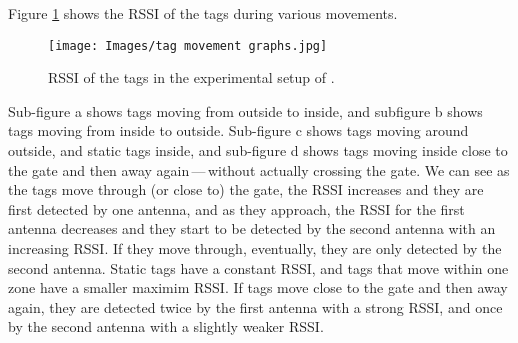 \documentclass{article}
\begin{document}
Figure \ref{fig:Alfian_setup} shows the \ac{RSSI} of the tags during various movements.
%
\begin{figure}[h]
    \centering
    \texttt{[image: Images/tag movement graphs.jpg]}
    \caption{RSSI of the tags in the experimental setup of \citet{ref:Alfian}.}
    \label{fig:Alfian_setup}
\end{figure}
%
Sub-figure a shows tags moving from outside to inside, and subfigure b shows tags moving from inside to outside.
Sub-figure c shows tags moving around outside, and static tags inside, and sub-figure d shows tags moving inside close to the gate and then away again\,---\,without actually crossing the gate.
We can see as the tags move through (or close to) the gate, the \ac{RSSI} increases and they are first detected by one antenna, and as they approach, the \ac{RSSI} for the first antenna decreases and they start to be detected by the second antenna with an increasing \ac{RSSI}.
If they move through, eventually, they are only detected by the second antenna.
Static tags have a constant \ac{RSSI}, and tags that move within one zone have a smaller maximim \ac{RSSI}.
If tags move close to the gate and then away again, they are detected twice by the first antenna with a strong \ac{RSSI}, and once by the second antenna with a slightly weaker \ac{RSSI}.
\end{document}
